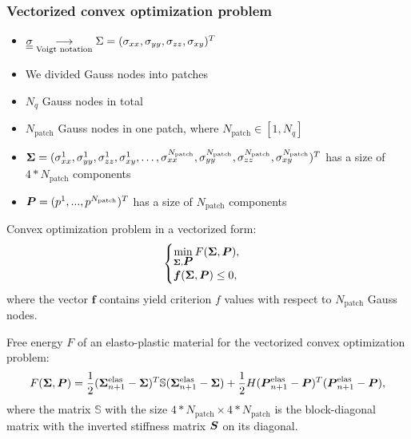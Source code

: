 \documentclass[9pt]{beamer}
\begin{document}
\begin{frame}
  \frametitle{Vectorized convex optimization problem}
  \begin{itemize}
    \item $\underline{\underline{\sigma}} \underset{\text{Voigt notation}}{\longrightarrow} \Sigma = (\sigma_{xx}, \sigma_{yy}, \sigma_{zz}, \sigma_{xy})^T$ 
    \item We divided Gauss nodes into patches
    \item $N_q$ Gauss nodes in total
    \item $N_\text{patch}$ Gauss nodes in one patch, where $N_\text{patch} \in [1, N_q]$
    \item $\bm{\Sigma} = (\sigma_{xx}^1, \sigma_{yy}^1, \sigma_{zz}^1, \sigma_{xy}^1, \dots, \sigma_{xx}^{N_\text{patch}}, \sigma_{yy}^{N_\text{patch}}, \sigma_{zz}^{N_\text{patch}}, \sigma_{xy}^{N_\text{patch}})^T$ has a size of $4*N_\text{patch}$ components
    \item $\mbox{\boldmath $P$} = (p^1, ..., p^{N_\text{patch}})^T$ has a size of $N_\text{patch}$ components
  \end{itemize}
  Convex optimization problem in a vectorized form:
  \begin{equation}
    \label{eqn:conic_problem_vectorized}
    \begin{cases}
        \min\limits_{\bm{\Sigma}, \mbox{\boldmath $P$}} F(\bm{\Sigma}, \mbox{\boldmath $P$}), \\
        \mbox{\boldmath $f$}(\bm{\Sigma}, \mbox{\boldmath $P$}) \leq 0,
    \end{cases}
  \end{equation}
  where the vector $\mathbold{f}$ contains yield criterion $f$ values with respect to $N_\text{patch}$ Gauss nodes. 

  Free energy $F$ of an elasto-plastic material for the vectorized convex optimization problem:
  \begin{equation}
    F(\bm{\Sigma}, \mbox{\boldmath $P$}) = \frac{1}{2}(\bm{\Sigma}_{n+1}^\text{elas} - \bm{\Sigma})^T \mathbb{S} (\bm{\Sigma}_{n+1}^\text{elas} - \bm{\Sigma}) + \frac{1}{2}H(\mbox{\boldmath $P$}_{n+1}^\text{elas} - \mbox{\boldmath $P$})^T(\mbox{\boldmath $P$}_{n+1}^\text{elas} - \mbox{\boldmath $P$}),
  \end{equation}
  where the matrix $\mathbb{S}$ with the size $4*N_\text{patch}\times4*N_\text{patch}$ is the block-diagonal matrix with the inverted stiffness matrix $\mbox{\boldmath $S$}$ on its diagonal.
\end{frame}
\end{document}
